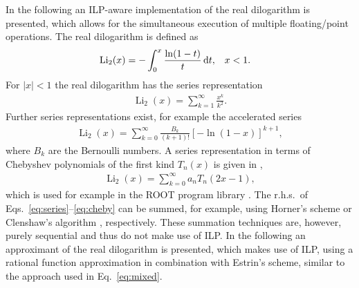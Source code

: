 \documentclass[10pt,DIV16,twocolumn,numbers=noenddot]{scrartcl}
\newcommand{\Li}{\operatorname{Li}_2}
\begin{document}
In the following an ILP-aware implementation of the real dilogarithm
is presented, which allows for the simultaneous execution of multiple
floating\-/point operations.  The real dilogarithm is defined as
%
\begin{align}
  \Li(x) &= -\int_0^x \frac{\ln(1-t)}{t} \, \textnormal{d}t, &
  &x<1.
\end{align}
%
For $|x|<1$ the real dilogarithm has the series representation
%
\begin{align}
  \Li(x) = \sum_{k=1}^\infty \frac{x^k}{k^2}.
  \label{eq:series}
\end{align}
%
Further series representations exist, for example the accelerated
series
%
\begin{align}
  \Li(x) = \sum_{k=0}^\infty \frac{B_k}{(k+1)!} [-\ln(1-x)]^{k+1},
\end{align}
%
where $B_k$ are the Bernoulli numbers.  A series representation in
terms of Chebyshev polynomials of the first kind $T_n(x)$ is given in
\cite{luke},
%
\begin{align}
  \Li(x) = \sum_{k=0}^\infty a_n T_n(2x-1),
  \label{eq:cheby}
\end{align}
%
which is used for example in the ROOT program library \cite{root}.
The r.h.s.\ of Eqs.~\eqref{eq:series}--\eqref{eq:cheby} can be summed,
for example, using Horner's scheme or Clenshaw's algorithm
\cite{clenshaw}, respectively.  These summation techniques are,
however, purely sequential and thus do not make use of ILP.  In the
following an approximant of the real dilogarithm is presented, which
makes use of ILP, using a rational function approximation in
combination with Estrin's scheme, similar to the approach used in
Eq.~\eqref{eq:mixed}.
\end{document}

